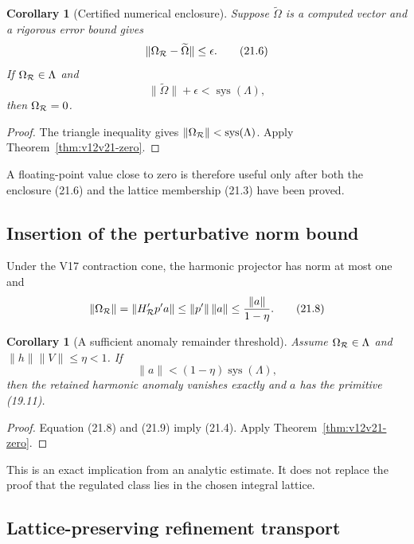 \documentclass[11pt]{article}
\newtheorem{corollary}[theorem]{Corollary}
\theoremstyle{remark}
\begin{document}
\begin{corollary}[Certified numerical enclosure]
\label{cor:v12v21-interval}
Suppose \(\widetilde\Omega\) is a computed vector and a rigorous error
bound gives
\[
 \|\Omega_{\cal R}-\widetilde\Omega\|\le\epsilon.           \tag{21.6}
\]
If \(\Omega_{\cal R}\in\Lambda\) and
\[
 \|\widetilde\Omega\|+\epsilon
 <\operatorname{sys}(\Lambda),                             \tag{21.7}
\]
then \(\Omega_{\cal R}=0\).
\end{corollary}

\begin{proof}
The triangle inequality gives
\(\|\Omega_{\cal R}\|<\operatorname{sys}(\Lambda)\).
Apply Theorem~\ref{thm:v12v21-zero}.
\end{proof}

A floating-point value close to zero is therefore useful only after
both the enclosure (21.6) and the lattice membership (21.3) have
been proved.

\subsection{Insertion of the perturbative norm bound}

Under the V17 contraction cone, the harmonic projector has norm at
most one and
\[
 \|\Omega_{\cal R}\|
 =\|H_{\cal R}'p'a\|
 \le\|p'\|\,\|a\|
 \le\frac{\|a\|}{1-\eta}.                                  \tag{21.8}
\]

\begin{corollary}[A sufficient anomaly remainder threshold]
\label{cor:v12v21-threshold}
Assume \(\Omega_{\cal R}\in\Lambda\) and
\(\|h\|\|V\|\le\eta<1\).  If
\[
 \boxed{
 \|a\|<(1-\eta)\operatorname{sys}(\Lambda),}               \tag{21.9}
\]
then the retained harmonic anomaly vanishes exactly and \(a\) has
the primitive (19.11).
\end{corollary}

\begin{proof}
Equation (21.8) and (21.9) imply (21.4).  Apply
Theorem~\ref{thm:v12v21-zero}.
\end{proof}

This is an exact implication from an analytic estimate.  It does not
replace the proof that the regulated class lies in the chosen
integral lattice.

\subsection{Lattice-preserving refinement transport}
\end{document}
